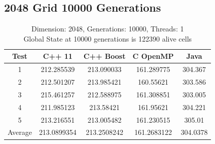 \documentclass[11pt]{article} %
\begin{document}
\subsection{2048 Grid 10000 Generations}
\begin{table}[ht]

\caption{Dimension: 2048, Generations: 10000, Threads: 1\\Global State at 10000 generations is 122390 alive cells} %

\centering %

\begin{tabular}{c c c c c} %

\hline\hline %

Test & C++ 11 & C++ Boost & C OpenMP & Java \\ [0.5ex] %


\hline %

1 & 212.285539 & 213.090033 & 161.289775 & 304.367 \\
2 & 212.501207 & 213.985421 & 160.55621 & 303.586 \\
3 & 215.461257 & 212.588975 & 161.308851 & 303.005 \\
4 & 211.985123 & 213.58421 & 161.95621 & 304.221 \\
5 & 213.216551 & 213.005482 & 161.230515 & 305.01 \\
Average & 213.0899354 & 213.2508242 & 161.2683122 & 304.0378 \\ [1ex]


\hline %

\end{tabular}
\end{table}
\end{document}
